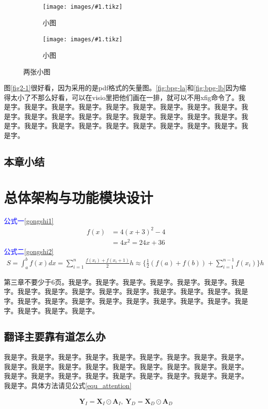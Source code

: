 \documentclass[supercite]{HustGraduPaper}
\newcommand{\sfig}[3]{
  \begin{subfigure}[b]{#2\textwidth}
    \texttt{[image: images/\#1.tikz]}
    \caption{#3}
    \label{fig:#1}
  \end{subfigure}
}
\newcommand{\xfig}[3]{
  \begin{figure}[htb]
    \centering
    #3
    \caption{#2}
    \label{fig:#1}
  \end{figure}
}
\newcommand{\rfig}[1]{\autoref{fig:#1}}
\theoremstyle{definition}
\begin{document}
\xfig{bpg-l}{两张小图}{
  \sfig{bpg-la}{0.3}{小图}
  \sfig{bpg-lb}{0.3}{小图}
}

图\ref{fig2-1}很好看，因为采用的是pdf格式的矢量图。\rfig{bpg-la}和\rfig{bpg-lb}因为缩得太小了不那么好看，可以在visio里把他们画在一排，就可以不用xfig命令了。我是字。我是字。我是字。我是字。我是字。我是字。我是字。我是字。我是字。我是字。我是字。我是字。我是字。我是字。我是字。我是字。我是字。我是字。我是字。我是字。我是字。我是字。我是字。我是字。我是字。我是字。我是字。我是字。

\subsection{本章小结}

\newpage

\section{总体架构与功能模块设计}
\textcolor{blue}{公式一\ref{gongshi1}}
\begin{align}
	f(x)&=4(x+3)^2-4 \nonumber\\
	&=4x^2=24x+36 
	\label{gongshi1}
\end{align}
\textcolor{blue}{公式二\ref{gongshi2}}
\begin{eqnarray}
	S=\int_{a}^{b}f(x)dx=\sum_{i=1}^{n}\frac{f(x_i)+f(x_i+1)}{2}h\approx\{\frac{1}{2}(f(a)+f(b))+\sum_{i=1}^{n-1}f(x_i)\}h 
	\label{gongshi2}
\end{eqnarray}
 
 
第三章不要少于6页\cite{STR2021Neurocom}。我是字。我是字。我是字。我是字。我是字。我是字。我是字。我是字。我是字。我是字。我是字。我是字。我是字。我是字。我是字。我是字。我是字。我是字。我是字。我是字。我是字。我是字。我是字。我是字。我是字。我是字。我是字。我是字。

\subsection{翻译主要靠有道怎么办}

我是字\cite{MU-MIMO2009IEEE}。我是字。我是字。我是字。我是字。我是字。我是字。我是字。我是字。我是字。我是字。我是字。我是字。我是字。我是字。我是字。我是字。我是字。我是字。我是字。我是字。我是字。我是字。我是字。我是字。我是字。我是字。我是字。具体方法请见公式\ref{equ_attention}

\begin{eqnarray}\label{equ_attention}
	\textbf{Y}_I=\textbf{X}_I{\odot}\textbf{A}_I,~\textbf{Y}_D=\textbf{X}_D{\odot}\textbf{A}_D %
\end{eqnarray}
\end{document}
